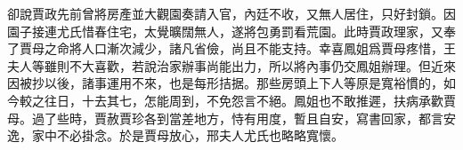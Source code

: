 


\begin{parag}
    卻說賈政先前曾將房產並大觀園奏請入官，內廷不收，又無人居住，只好封鎖。因園子接連尤氏惜春住宅，太覺曠闊無人，遂將包勇罰看荒園。此時賈政理家，又奉了賈母之命將人口漸次減少，諸凡省儉，尚且不能支持。幸喜鳳姐爲賈母疼惜，王夫人等雖則不大喜歡，若說治家辦事尚能出力，所以將內事仍交鳳姐辦理。但近來因被抄以後，諸事運用不來，也是每形拮据。那些房頭上下人等原是寬裕慣的，如今較之往日，十去其七，怎能周到，不免怨言不絕。鳳姐也不敢推遲，扶病承歡賈母。過了些時，賈赦賈珍各到當差地方，恃有用度，暫且自安，寫書回家，都言安逸，家中不必掛念。於是賈母放心，邢夫人尤氏也略略寬懷。
\end{parag}


\begin{parag}

\end{parag}
